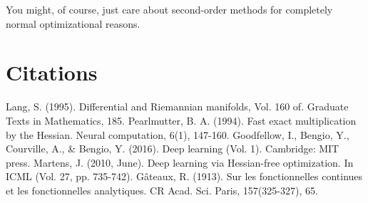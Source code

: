 \documentclass{article}
\begin{document}
You might, of course, just care about second-order methods for completely normal optimizational reasons.

\section{Citations}

\begin{thebibliography}{9}
Lang, S. (1995). Differential and Riemannian manifolds, Vol. 160 of. Graduate Texts in Mathematics, 185.
Pearlmutter, B. A. (1994). Fast exact multiplication by the Hessian. Neural computation, 6(1), 147-160.
Goodfellow, I., Bengio, Y., Courville, A., \& Bengio, Y. (2016). Deep learning (Vol. 1). Cambridge: MIT press.
Martens, J. (2010, June). Deep learning via Hessian-free optimization. In ICML (Vol. 27, pp. 735-742).
G\^{a}teaux, R. (1913). Sur les fonctionnelles continues et les fonctionnelles analytiques. CR Acad. Sci. Paris, 157(325-327), 65.
\end{thebibliography}
\end{document}
